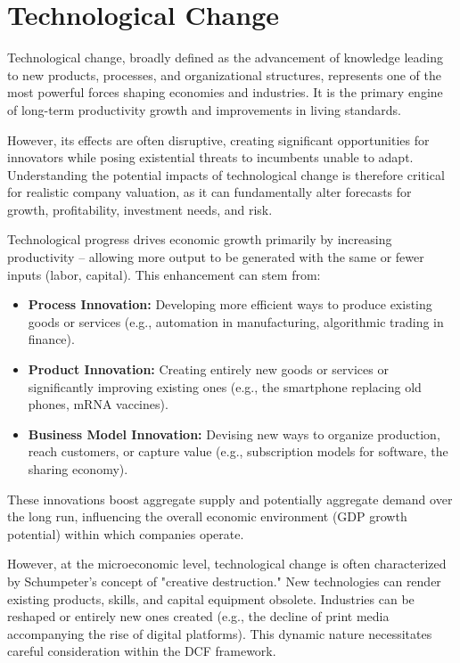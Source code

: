 \chapter{Technological Change}
\label{chap:tech_change}

Technological change, broadly defined as the advancement of knowledge leading to new products, processes, and organizational structures, represents one of the most powerful forces shaping economies and industries. It is the primary engine of long-term productivity growth and improvements in living standards. 

However, its effects are often disruptive, creating significant opportunities for innovators while posing existential threats to incumbents unable to adapt. Understanding the potential impacts of technological change is therefore critical for realistic company valuation, as it can fundamentally alter forecasts for growth, profitability, investment needs, and risk.

Technological progress drives economic growth primarily by increasing productivity – allowing more output to be generated with the same or fewer inputs (labor, capital). This enhancement can stem from:
\begin{itemize}
    \item \textbf{Process Innovation:} Developing more efficient ways to produce existing goods or services (e.g., automation in manufacturing, algorithmic trading in finance).
    \item \textbf{Product Innovation:} Creating entirely new goods or services or significantly improving existing ones (e.g., the smartphone replacing old phones, mRNA vaccines).
    \item \textbf{Business Model Innovation:} Devising new ways to organize production, reach customers, or capture value (e.g., subscription models for software, the sharing economy).
\end{itemize}
These innovations boost aggregate supply and potentially aggregate demand over the long run, influencing the overall economic environment (GDP growth potential) within which companies operate.

However, at the microeconomic level, technological change is often characterized by Schumpeter's concept of "creative destruction." New technologies can render existing products, skills, and capital equipment obsolete. Industries can be reshaped or entirely new ones created (e.g., the decline of print media accompanying the rise of digital platforms). This dynamic nature necessitates careful consideration within the DCF framework.

